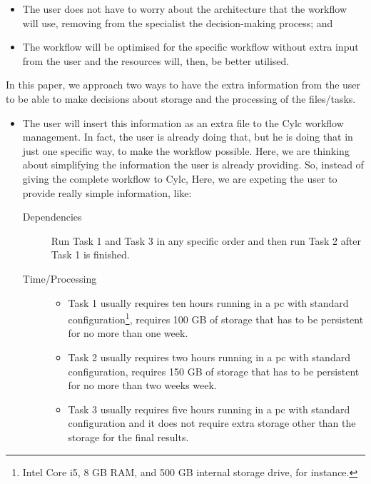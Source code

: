 \documentclass[a4paper]{article}
\begin{document}
\begin{itemize}

\item The user does not have to worry about the architecture that the workflow will use, removing from the specialist the decision-making process; and

\item The workflow will be optimised for the specific workflow without extra input from the user and the resources will, then, be better utilised.

\end{itemize}

In this paper, we approach two ways to have the extra information from the user to be able to make decisions about storage and the processing of the files/tasks.

\begin{itemize}

\item The user will insert this information as an extra file to the Cylc workflow management. In fact, the user is already doing that, but he is doing that in just one specific way, to make the workflow possible. Here, we are thinking about simplifying the information the user is already providing. So, instead of giving the complete workflow to Cylc, Here, we are expeting the user to provide really simple information, like:

\begin{description}

\item[Dependencies] Run Task 1 and Task 3 in any specific order and then run Task 2 after Task 1 is finished.

\item[Time/Processing]

\begin{itemize}

\item Task 1 usually requires ten hours running in a pc with standard configuration\footnote{Intel Core i5, 8 GB RAM, and 500 GB internal storage drive, for instance.}, requires 100 GB of storage that has to be persistent for no more than one week.

\item Task 2 usually requires two hours running in a pc with standard configuration, requires 150 GB of storage that has to be persistent for no more than two weeks week.

\item Task 3 usually requires five hours running in a pc with standard configuration and it does not require extra storage other than the storage for the final results.


\end{itemize}
\end{description}
\end{itemize}
\end{document}
